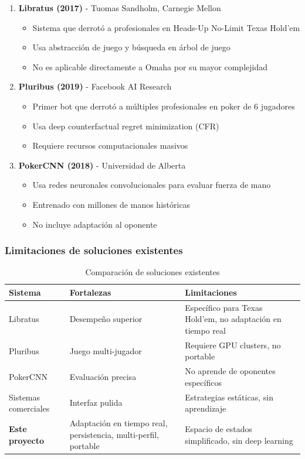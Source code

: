 \documentclass[12pt,a4paper]{article}
\begin{document}
\begin{enumerate}
    \item \textbf{Libratus (2017)} - Tuomas Sandholm, Carnegie Mellon
    \begin{itemize}
        \item Sistema que derrotó a profesionales en Heads-Up No-Limit Texas Hold'em
        \item Usa abstracción de juego y búsqueda en árbol de juego
        \item No es aplicable directamente a Omaha por su mayor complejidad
    \end{itemize}
    
    \item \textbf{Pluribus (2019)} - Facebook AI Research
    \begin{itemize}
        \item Primer bot que derrotó a múltiples profesionales en poker de 6 jugadores
        \item Usa deep counterfactual regret minimization (CFR)
        \item Requiere recursos computacionales masivos
    \end{itemize}
    
    \item \textbf{PokerCNN (2018)} - Universidad de Alberta
    \begin{itemize}
        \item Usa redes neuronales convolucionales para evaluar fuerza de mano
        \item Entrenado con millones de manos históricas
        \item No incluye adaptación al oponente
    \end{itemize}
\end{enumerate}

\subsubsection{Limitaciones de soluciones existentes}

\begin{table}[H]
\centering
\caption{Comparación de soluciones existentes}
\begin{tabular}{|p{3cm}|p{5cm}|p{6cm}|}
\hline
\textbf{Sistema} & \textbf{Fortalezas} & \textbf{Limitaciones} \\
\hline
Libratus & Desempeño superior & Específico para Texas Hold'em, no adaptación en tiempo real \\
\hline
Pluribus & Juego multi-jugador & Requiere GPU clusters, no portable \\
\hline
PokerCNN & Evaluación precisa & No aprende de oponentes específicos \\
\hline
Sistemas comerciales & Interfaz pulida & Estrategias estáticas, sin aprendizaje \\
\hline
\textbf{Este proyecto} & Adaptación en tiempo real, persistencia, multi-perfil, portable & Espacio de estados simplificado, sin deep learning \\
\hline
\end{tabular}
\label{tab:comparacion}
\end{table}
\end{document}
